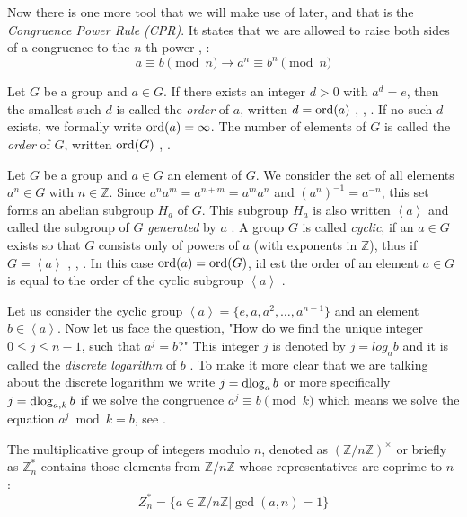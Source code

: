 Now there is one more tool that we will make use of later, and that is the \textit{Congruence Power Rule (CPR)}. It states that we are allowed to raise both sides of a congruence to the $n$-th power \cite[p.~19]{Ref_Mueller-Stach_2011}, \cite[p.~117]{Ref_Benjamin_2009}:
\begin{equation}
\label{eq:congruence_power_rule}
a\equiv b\pmod n\rightarrow a^n\equiv b^n\pmod n
\end{equation}

Let $G$ be a group and $a\in G$. If there exists an integer $d>0$ with $a^d=e$, then the smallest such $d$ is called the \textit{order} of $a$, written $d=\operatorname{ord}(a)$ \cite[p.~35]{Ref_Wolfart_2011}, \cite[p.~50]{Ref_Forster_2015}, \cite[p.~240]{Ref_Modler_Kreh_2012}. If no such $d$ exists, we formally write $\operatorname{ord}(a)=\infty$. The number of elements of $G$ is called the \textit{order} of $G$, written $\operatorname{ord}(G)$ \cite[p.~26]{Ref_Wolfart_2011}, \cite[p.~50]{Ref_Forster_2015}.

Let $G$ be a group and $a\in G$ an element of $G$. We consider the set of all elements $a^n\in G$ with $n\in\mathbb{Z}$. Since $a^na^m=a^{n+m}=a^ma^n$ and $(a^n)^{-1}=a^{-n}$, this set forms an abelian subgroup $H_a$ of $G$. This subgroup $H_a$ is also written $\left<a\right>$ and called the subgroup of $G$ \textit{generated} by $a$ \cite[p.~50]{Ref_Forster_2015}. A group $G$ is called \textit{cyclic}, if an $a\in G$ exists so that $G$ consists only of powers of $a$ (with exponents in $\mathbb{Z}$), thus if $G=\left<a\right>$ \cite[p.~34]{Ref_Wolfart_2011}, \cite[p.~50]{Ref_Forster_2015}, \cite[p.~240]{Ref_Modler_Kreh_2012}. In this case $\operatorname{ord}(a)=\operatorname{ord}(G)$, id est the order of an element $a\in G$ is equal to the order of the cyclic subgroup $\left<a\right>$ \cite[p.~50]{Ref_Forster_2015}.

Let us consider the cyclic group $\left<a\right>=\{e,a,a^2,\ldots,a^{n-1}\}$ and an element $b\in\left<a\right>$. Now let us face the question, "How do we find the unique integer $0\le j\le n-1$, such that $a^j=b$?" This integer $j$ is denoted by $j=log_ab$ and it is called the \textit{discrete logarithm} of $b$ \cite[p.~255-256]{Ref_Stinson_Paterson_2019}. To make it more clear that we are talking about the discrete logarithm we write $j=\operatorname{dlog}_ab$ or more specifically $j=\operatorname{dlog}_{a,k}b$ if we solve the congruence $a^j\equiv b\pmod k$ which means we solve the equation $a^j\bmod k=b$, see \cite{Ref_Jain_2011}.

The multiplicative group of integers modulo $n$, denoted as $(\mathbb{Z}/n\mathbb{Z})^\times$ or briefly as $\mathbb{Z}_n^\ast$ contains those elements from $\mathbb{Z}/n\mathbb{Z}$ whose representatives are coprime to $n$ \cite[p.~87]{Ref_Teschl_2013}:
\begin{equation}
\label{eq:multiplicative_group_mod_n}
Z_n^\ast=\{a\in\mathbb{Z}/n\mathbb{Z}|\gcd(a,n)=1\}
\end{equation}

